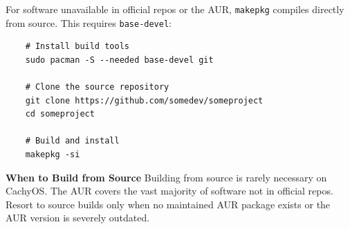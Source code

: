 \documentclass{article}
\newcommand{\code}[1]{\colorbox{codebg}{\texttt{#1}}}
\begin{document}
For software unavailable in official repos or the AUR, \code{makepkg} compiles
directly from source. This requires \code{base-devel}:

\begin{verbatim}
	# Install build tools
	sudo pacman -S --needed base-devel git
	
	# Clone the source repository
	git clone https://github.com/somedev/someproject
	cd someproject
	
	# Build and install
	makepkg -si
\end{verbatim}

\begin{callout}{\textbf{When to Build from Source}}
	Building from source is rarely necessary on CachyOS. The AUR covers the vast
	majority of software not in official repos. Resort to source builds only when no
	maintained AUR package exists or the AUR version is severely outdated.
\end{callout}
\end{document}
